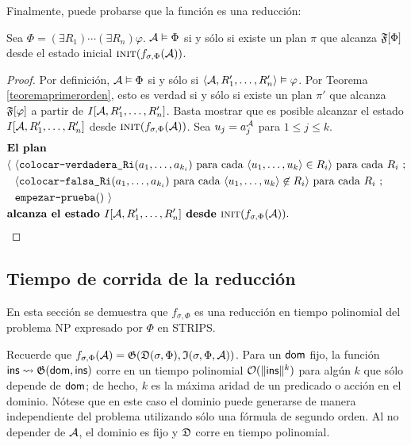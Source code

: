 Finalmente, puede probarse que la función es una reducción:
\begin{theorem}
Sea $\Phi = (\exists R_1)\cdots(\exists R_n) \varphi$.
$\mathcal{A} \vDash \Phi$ si y sólo si existe un plan $\pi$ que alcanza $\mathfrak{F}[\Phi]$
desde el estado inicial $\textsc{init}(f_{\sigma,\Phi}(\mathcal{A}))$.
\end{theorem}
\begin{proof}
Por definición, $\mathcal{A} \vDash \Phi$ si y sólo si
$\langle \mathcal{A}, R_1',\ldots,R_n' \rangle \vDash \varphi$.
Por Teorema \ref{teoremaprimerorden}, esto es verdad si y sólo si 
existe un plan $\pi'$ que alcanza $\mathfrak{F}[\varphi]$ a partir de $I[\mathcal{A},
R_1',\ldots,R_n']$.
Basta mostrar que es posible alcanzar el estado $I[\mathcal{A}, R_1',\ldots,R_n']$ desde
$\textsc{init}(f_{\sigma,\Phi}(\mathcal{A}))$. Sea $u_j = a_j^{\mathcal{A}}$ para $1 \leq j \leq k$.
\begin{alignat*}{1}
& \textbf{El plan }\\
& \langle \ \tup{\texttt{colocar-verdadera\_Ri}(a_1,\ldots,a_{k_i}) 
\text{ para cada } \tup{u_1,\ldots,u_k} \in R_i} \text{ para cada } R_i \ ;\\
& {\color{white} \langle \ } \tup{\texttt{colocar-falsa\_Ri}(a_1,\ldots,a_{k_i}) \text { para cada
} \tup{u_1,\ldots,u_k} \not\in R_i} \text{ para cada } R_i\ ;\\
& {\color{white} \langle \ } \texttt{empezar-prueba}()\ \rangle\\
& \textbf{alcanza el estado } I[\A, R_1',\ldots,R_n'] \textbf{ desde }
\textsc{init}(f_{\sigma,\Phi}(\A)).
\end{alignat*}
\end{proof}

\subsection{Tiempo de corrida de la reducción}
En esta sección se demuestra que $f_{\sigma,\Phi}$ es una reducción en tiempo
polinomial del problema NP expresado por $\Phi$ en STRIPS.

Recuerde que 
$ f_{\sigma,\Phi}(\mathcal{A}) = \mathfrak{G}(\mathfrak{D}(\sigma,\Phi),\mathfrak{I}(\sigma,\Phi,\mathcal{A}))
$.
Para un $\mathsf{dom}$ fijo, la función
$\mathsf{ins}\leadsto\mathfrak{G}(\mathsf{dom}, \mathsf{ins})$ corre en un tiempo polinomial
$\mathcal{O}(\|\mathsf{ins}\|^k)$ para algún $k$ que sólo depende de $\mathsf{dom}$; de hecho,
$k$ es la máxima aridad de un predicado o acción en el dominio. Nótese que en
este caso el dominio puede generarse de manera independiente del problema 
utilizando sólo una fórmula de segundo orden. Al no depender de $\mathcal{A}$, el
dominio es fijo y $\mathfrak{D}$ corre en tiempo polinomial.


